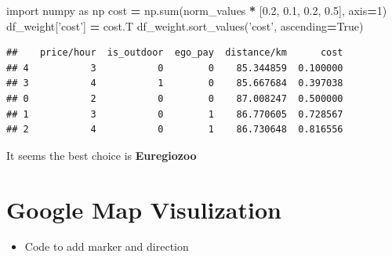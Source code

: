 \documentclass[]{book}
\newenvironment{Shaded}{\begin{snugshade}}{\end{snugshade}}
\newcommand{\BuiltInTok}[1]{#1}
\newcommand{\DecValTok}[1]{\textcolor[rgb]{0.00,0.00,0.81}{#1}}
\newcommand{\FloatTok}[1]{\textcolor[rgb]{0.00,0.00,0.81}{#1}}
\newcommand{\ImportTok}[1]{#1}
\newcommand{\NormalTok}[1]{#1}
\newcommand{\OperatorTok}[1]{\textcolor[rgb]{0.81,0.36,0.00}{\textbf{#1}}}
\newcommand{\StringTok}[1]{\textcolor[rgb]{0.31,0.60,0.02}{#1}}
\newcommand{\VariableTok}[1]{\textcolor[rgb]{0.00,0.00,0.00}{#1}}
\providecommand{\tightlist}{%
  \setlength{\itemsep}{0pt}\setlength{\parskip}{0pt}}
\begin{document}
\begin{Shaded}
\begin{Highlighting}[]
\ImportTok{import}\NormalTok{ numpy }\ImportTok{as}\NormalTok{ np}
\NormalTok{cost }\OperatorTok{=}\NormalTok{ np.}\BuiltInTok{sum}\NormalTok{(norm_values }\OperatorTok{*}\NormalTok{ [}\FloatTok{0.2}\NormalTok{, }\FloatTok{0.1}\NormalTok{, }\FloatTok{0.2}\NormalTok{, }\FloatTok{0.5}\NormalTok{], axis}\OperatorTok{=}\DecValTok{1}\NormalTok{)}
\NormalTok{df_weight[}\StringTok{'cost'}\NormalTok{] }\OperatorTok{=}\NormalTok{ cost.T}
\NormalTok{df_weight.sort_values(}\StringTok{'cost'}\NormalTok{, ascending}\OperatorTok{=}\VariableTok{True}\NormalTok{)}
\end{Highlighting}
\end{Shaded}

\begin{verbatim}
##    price/hour  is_outdoor  ego_pay  distance/km      cost
## 4           3           0        0    85.344859  0.100000
## 3           4           1        0    85.667684  0.397038
## 0           2           0        0    87.008247  0.500000
## 1           3           0        1    86.770605  0.728567
## 2           4           0        1    86.730648  0.816556
\end{verbatim}

It seems the best choice is \textbf{Euregiozoo}

\hypertarget{google-map-visulization}{%
\chapter{Google Map Visulization}\label{google-map-visulization}}

\begin{itemize}
\tightlist
\item
  Code to add marker and direction
\end{itemize}
\end{document}

